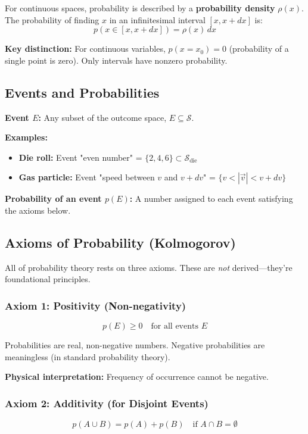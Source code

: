 \documentclass[9pt,twocoloumn]{article}
\begin{document}
For continuous spaces, probability is described by a \textbf{probability density} $\rho(x)$. The probability of finding $x$ in an infinitesimal interval $[x, x+dx]$ is:
\begin{equation}
p(x \in [x, x+dx]) = \rho(x) \, dx
\end{equation}

\textbf{Key distinction:} For continuous variables, $p(x = x_0) = 0$ (probability of a single point is zero). Only intervals have nonzero probability.

\subsection{Events and Probabilities}

\textbf{Event $E$:} Any subset of the outcome space, $E \subseteq \mathcal{S}$.

\textbf{Examples:}
\begin{itemize}
    \item \textbf{Die roll:} Event "even number" = $\{2, 4, 6\} \subset \mathcal{S}_{\text{die}}$
    \item \textbf{Gas particle:} Event "speed between $v$ and $v+dv$" = $\{v < |\vec{v}| < v+dv\}$
\end{itemize}

\textbf{Probability of an event $p(E)$:} A number assigned to each event satisfying the axioms below.

\subsection{Axioms of Probability (Kolmogorov)}

All of probability theory rests on three axioms. These are \emph{not} derived—they're foundational principles.

\subsubsection{Axiom 1: Positivity (Non-negativity)}
\begin{equation}
\boxed{p(E) \geq 0 \quad \text{for all events } E}
\end{equation}

Probabilities are real, non-negative numbers. Negative probabilities are meaningless (in standard probability theory).

\textbf{Physical interpretation:} Frequency of occurrence cannot be negative.

\subsubsection{Axiom 2: Additivity (for Disjoint Events)}
\begin{equation}
\boxed{p(A \cup B) = p(A) + p(B) \quad \text{if } A \cap B = \emptyset}
\end{equation}
\end{document}
